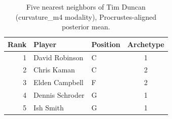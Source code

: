 \begin{table}[htbp]
  \centering\small
  \begin{tabular}{rllc}
    \toprule
    Rank & Player & Position & Archetype \\
    \midrule
    1 & David Robinson & C & 1 \\
    2 & Chris Kaman & C & 2 \\
    3 & Elden Campbell & F & 2 \\
    4 & Dennis Schroder & G & 1 \\
    5 & Ish Smith & G & 1 \\
    \bottomrule
  \end{tabular}
  \caption{Five nearest neighbors of Tim Duncan (curvature_m4 modality), Procrustes-aligned posterior mean.}
  \label{tab:Tim_Duncan_neighbors_curvature_m4}
\end{table}

